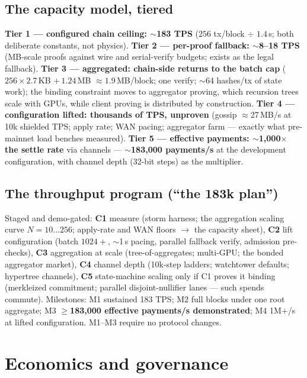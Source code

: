 \documentclass[11pt]{article}
\begin{document}
\subsection{The capacity model, tiered}
\textbf{Tier 1 --- configured chain ceiling: $\sim$183 TPS} ($256$ tx/block $\div$ $1.4$\,s; both deliberate constants, not physics). \textbf{Tier 2 --- per-proof fallback: $\sim$8--18 TPS} (MB-scale proofs against wire and serial-verify budgets; exists as the legal fallback). \textbf{Tier 3 --- aggregated: chain-side returns to the batch cap} ($256\times2.7$\,KB $+\,1.24$\,MB $\approx 1.9$\,MB/block; one verify; $\sim$64 hashes/tx of state work); the binding constraint moves to aggregator proving, which recursion trees scale with GPUs, while client proving is distributed by construction. \textbf{Tier 4 --- configuration lifted: thousands of TPS, unproven} (gossip $\approx$27\,MB/s at 10k shielded TPS; apply rate; WAN pacing; aggregator farm --- exactly what pre-mainnet load benches measured). \textbf{Tier 5 --- effective payments: $\sim$1{,}000$\times$ the settle rate} via channels --- \textbf{$\sim$183{,}000 payments/s} at the development configuration, with channel depth (32-bit steps) as the multiplier.

\subsection{The throughput program (``the 183k plan'')}
Staged and demo-gated: \textbf{C1} measure (storm harness; the aggregation scaling curve $N{=}10\ldots256$; apply-rate and WAN floors $\rightarrow$ the capacity sheet), \textbf{C2} lift configuration (batch $1024{+}$, $\sim$1\,s pacing, parallel fallback verify, admission pre-checks), \textbf{C3} aggregation at scale (tree-of-aggregates; multi-GPU; the bonded aggregator market), \textbf{C4} channel depth (10k-step ladders; watchtower defaults; hypertree channels), \textbf{C5} state-machine scaling only if C1 proves it binding (merkleized commitment; parallel disjoint-nullifier lanes --- such spends commute). Milestones: M1 sustained 183 TPS; M2 full blocks under one root aggregate; M3 \textbf{$\ge$183{,}000 effective payments/s demonstrated}; M4 1M$+$/s at lifted configuration. M1--M3 require no protocol changes.

\section{Economics and governance}\label{sec:gov}
\end{document}
